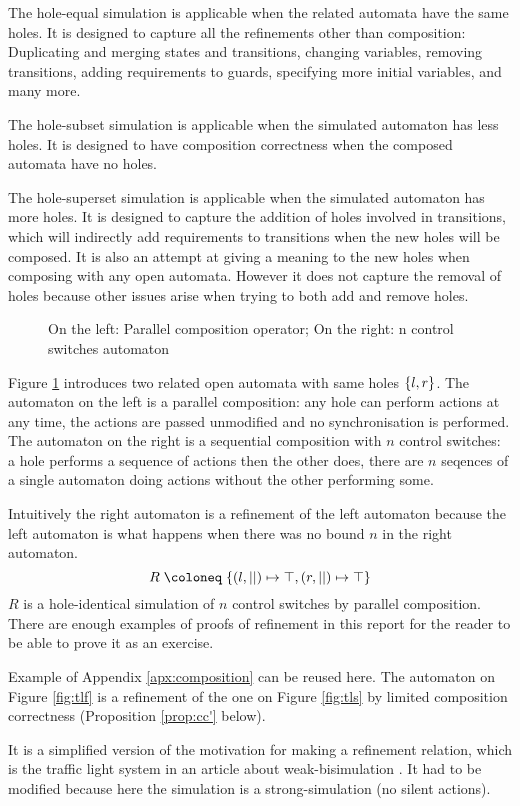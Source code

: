 \documentclass{article}
\begin{document}
The hole-equal simulation is applicable when the related automata have the same holes.
It is designed to capture all the refinements other than composition: Duplicating and merging states and transitions, changing variables, removing transitions, adding requirements to guards, specifying more initial variables, and many more.

The hole-subset simulation is applicable when the simulated automaton has less holes.
It is designed to have composition correctness when the composed automata have no holes.

The hole-superset simulation is applicable when the simulated automaton has more holes.
It is designed to capture the addition of holes involved in transitions, which will indirectly add requirements to transitions when the new holes will be composed.
It is also an attempt at giving a meaning to the new holes when composing with any open automata.
However it does not capture the removal of holes because other issues arise when trying to both add and remove holes.
\begin{exi}
\begin{figure}
\centering

\vrule

\caption{On the left: Parallel composition operator; On the right: n control switches automaton}
\label{fig:hisim}
\end{figure}
Figure \ref{fig:hisim} introduces two related open automata with same holes \({\left\{l, r\right\}}\).
The automaton on the left is a parallel composition: any hole can perform actions at any time, the actions are passed unmodified and no synchronisation is performed.
The automaton on the right is a sequential composition with \(n\) control switches: a hole performs a sequence of actions then the other does, there are \(n\) seqences of a single automaton doing actions without the other performing some.

Intuitively the right automaton is a refinement of the left automaton because the left automaton is what happens when there was no bound \(n\) in the right automaton.
\[ R \defobject \mbrc{\mpar{l, ||} \mapsto \top, \mpar{r, ||} \mapsto \top} \]
\(R\) is a hole-identical simulation of \(n\) control switches by parallel composition.
There are enough examples of proofs of refinement in this report for the reader to be able to prove it as an exercise.
\end{exi}
\begin{exi}
Example of Appendix \ref{apx:composition} can be reused here.
The automaton on Figure \ref{fig:tlf} is a refinement of the one on Figure \ref{fig:tls} by limited composition correctness (Proposition \ref{prop:cc'} below).

It is a simplified version of the motivation for making a refinement relation, which is the traffic light system in an article about weak-bisimulation \cite{wang:03126313}.
It had to be modified because here the simulation is a strong-simulation (no silent actions).
\end{exi}
\end{document}

